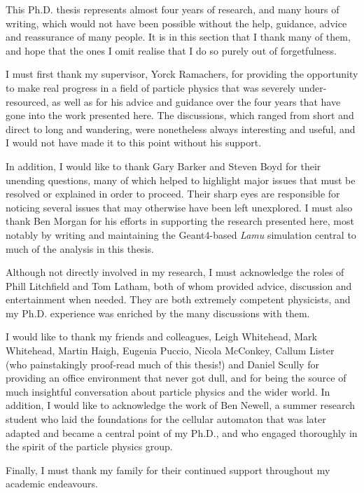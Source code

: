 This Ph.D. thesis represents almost four years of research, and many hours of writing, which would not have been possible without the help, guidance, advice and reassurance of many people. It is in this section that I thank many of them, and hope that the ones I omit realise that I do so purely out of forgetfulness.

I must first thank my supervisor, Yorck Ramachers, for providing the opportunity to make real progress in a field of particle physics that was severely under-resourced, as well as for his advice and guidance over the four years that have gone into the work presented here. The discussions, which ranged from short and direct to long and wandering, were nonetheless always interesting and useful, and I would not have made it to this point without his support.

In addition, I would like to thank Gary Barker and Steven Boyd for their unending questions, many of which helped to highlight major issues that must be resolved or explained in order to proceed. Their sharp eyes are responsible for noticing several issues that may otherwise have been left unexplored. I must also thank Ben Morgan for his efforts in supporting the research presented here, most notably by writing and maintaining the Geant4-based \emph{Lamu} simulation central to much of the analysis in this thesis.

Although not directly involved in my research, I must acknowledge the roles of Phill Litchfield and Tom Latham, both of whom provided advice, discussion and entertainment when needed. They are both extremely competent physicists, and my Ph.D. experience was enriched by the many discussions with them.

I would like to thank my friends and colleagues, Leigh Whitehead, Mark Whitehead, Martin Haigh, Eugenia Puccio, Nicola McConkey, Callum Lister (who painstakingly proof-read much of this thesis!) and Daniel Scully for providing an office environment that never got dull, and for being the source of much insightful conversation about particle physics and the wider world. In addition, I would like to acknowledge the work of Ben Newell, a summer research student who laid the foundations for the cellular automaton that was later adapted and became a central point of my Ph.D., and who engaged thoroughly in the spirit of the particle physics group.

Finally, I must thank my family for their continued support throughout my academic endeavours.


